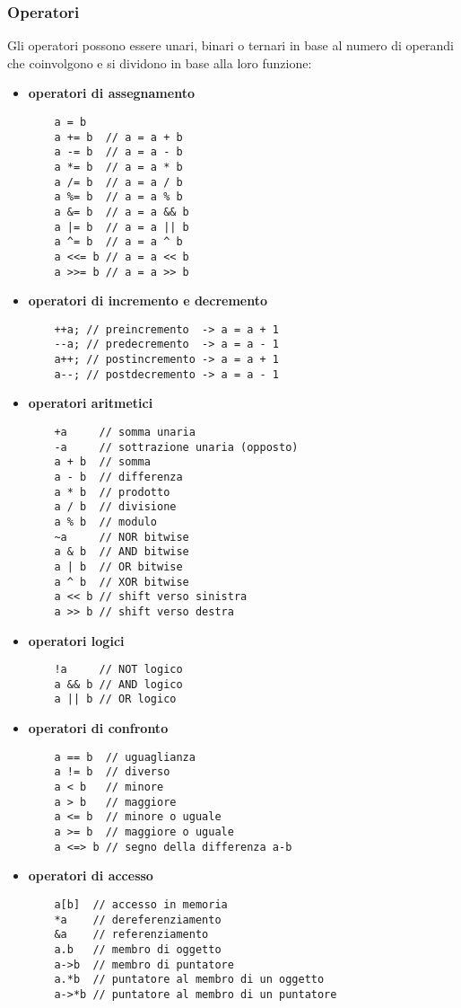 \documentclass[a4paper]{article}
\begin{document}
\subsubsection*{Operatori}
Gli operatori possono essere unari, binari o ternari in base al numero di operandi che coinvolgono e si dividono in base alla
loro funzione:
\begin{itemize}
\item \textbf{operatori di assegnamento}
\begin{lstlisting}
	a = b
	a += b  // a = a + b
	a -= b  // a = a - b
	a *= b  // a = a * b
	a /= b  // a = a / b
	a %= b  // a = a % b
	a &= b  // a = a && b
	a |= b  // a = a || b
	a ^= b  // a = a ^ b
	a <<= b // a = a << b
	a >>= b // a = a >> b
\end{lstlisting}

\item \textbf{operatori di incremento e decremento}
\begin{lstlisting}
	++a; // preincremento  -> a = a + 1
	--a; // predecremento  -> a = a - 1
	a++; // postincremento -> a = a + 1
	a--; // postdecremento -> a = a - 1
\end{lstlisting}

\item \textbf{operatori aritmetici}
\begin{lstlisting}
	+a     // somma unaria
	-a     // sottrazione unaria (opposto)
	a + b  // somma
	a - b  // differenza
	a * b  // prodotto
	a / b  // divisione
	a % b  // modulo
	~a     // NOR bitwise
	a & b  // AND bitwise
	a | b  // OR bitwise
	a ^ b  // XOR bitwise
	a << b // shift verso sinistra
	a >> b // shift verso destra
\end{lstlisting}

\item \textbf{operatori logici}
\begin{lstlisting}
	!a     // NOT logico
	a && b // AND logico
	a || b // OR logico
\end{lstlisting}

\item \textbf{operatori di confronto}
\begin{lstlisting}
	a == b  // uguaglianza
	a != b  // diverso
	a < b   // minore
	a > b   // maggiore
	a <= b  // minore o uguale
	a >= b  // maggiore o uguale
	a <=> b // segno della differenza a-b
\end{lstlisting}

\newpage

\item \textbf{operatori di accesso}
\begin{lstlisting}
	a[b]  // accesso in memoria
	*a    // dereferenziamento
	&a    // referenziamento
	a.b   // membro di oggetto
	a->b  // membro di puntatore
	a.*b  // puntatore al membro di un oggetto
	a->*b // puntatore al membro di un puntatore
\end{lstlisting}


\end{itemize}
\end{document}
